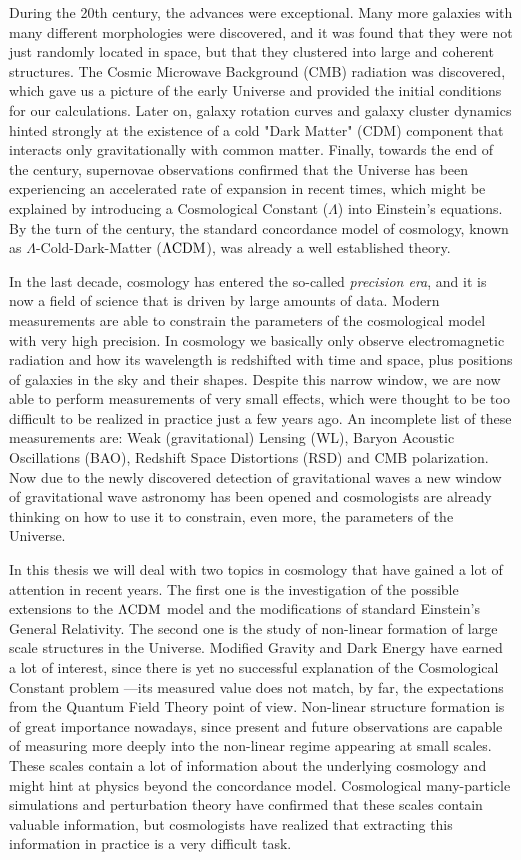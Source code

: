 During the 20th century, the advances were exceptional. Many more galaxies with many different morphologies were discovered,
and it was found that they were not just randomly located in space, but that they clustered into large and coherent structures. The Cosmic Microwave Background (CMB) radiation was discovered, which gave us a picture of the early Universe and provided the initial conditions for our calculations. 
Later on, galaxy rotation curves and galaxy cluster dynamics hinted strongly at the existence of a cold "Dark Matter" (CDM) component that interacts only gravitationally with common matter.
Finally, towards the end of the century, supernovae observations confirmed that the Universe 
has been experiencing an accelerated rate of expansion in recent times, which might be explained
by introducing a Cosmological Constant ($\Lambda$) into Einstein's equations. 
By the turn of the century, the standard concordance
model of cosmology, known as $\Lambda$-Cold-Dark-Matter ($\Lambda\mathrm{CDM}$), was already a well established theory.

In the last decade, cosmology has entered the so-called \emph{precision era}, and it is now a field of science that is driven by large amounts of data. Modern measurements are able to constrain the parameters of the cosmological model with very high precision. 
In cosmology we basically only observe electromagnetic radiation 
and how its wavelength is redshifted with time and space, plus positions of galaxies
in the sky and their shapes.
Despite this narrow window, we are now able to perform measurements of very small effects, which
were thought to be too difficult to be realized in practice just a few years ago. An incomplete list of these measurements 
are: Weak (gravitational) Lensing (WL), Baryon Acoustic Oscillations (BAO), Redshift Space Distortions (RSD) and CMB polarization.
Now due to the newly discovered detection of gravitational waves a new window of gravitational wave astronomy has been opened and cosmologists are already thinking on how to use it to constrain, even more, the parameters of the Universe.

In this thesis we will deal with two topics in cosmology that have gained a lot of attention in recent years. The first one is the investigation of the possible extensions to the $\Lambda\mathrm{CDM}$ model and the modifications of standard Einstein's General Relativity. The second one is the study of non-linear
formation of large scale structures in the Universe. 
Modified Gravity and Dark Energy have earned a lot of interest, since there is yet no successful explanation of the Cosmological Constant problem ---its measured value does not match, by far, the expectations from the Quantum Field Theory point of view. 
Non-linear structure formation is of great importance nowadays, since present and future observations are capable of 
measuring more deeply into the non-linear regime appearing at small scales. 
These scales contain a lot of information about the underlying cosmology and might hint at physics beyond the concordance model. Cosmological many-particle simulations and perturbation theory
have confirmed that these scales contain valuable information, 
but cosmologists have realized that extracting this information in practice is a very difficult task.

